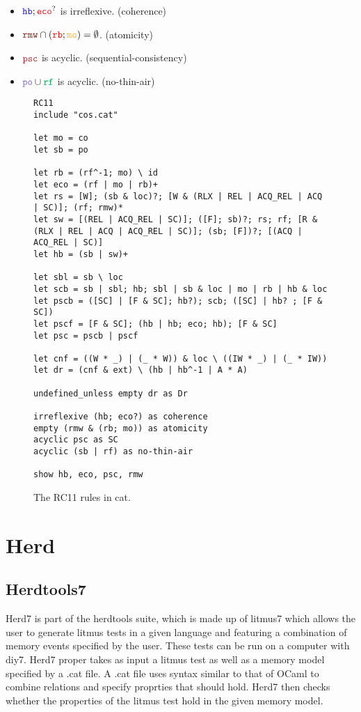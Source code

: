 \documentclass[a4,11pt,dvipsnames]{article}
\begin{document}
\begin{itemize}
\item $\texttt{\color{blue}hb} ; \texttt{\color{red}eco} ^?$ is irreflexive. \hfill (coherence)
\item $\rmw \cap (\rb ; \mo) = \emptyset$. \hfill (atomicity)
\item $\psc$ is acyclic. \hfill (sequential-consistency)
\item $\po \cup \rf$ is acyclic. \hfill (no-thin-air)
\end{itemize}


\begin{figure}
\centering
\begin{lstlisting}
RC11
include "cos.cat"

let mo = co
let sb = po

let rb = (rf^-1; mo) \ id
let eco = (rf | mo | rb)+
let rs = [W]; (sb & loc)?; [W & (RLX | REL | ACQ_REL | ACQ | SC)]; (rf; rmw)*
let sw = [(REL | ACQ_REL | SC)]; ([F]; sb)?; rs; rf; [R & (RLX | REL | ACQ | ACQ_REL | SC)]; (sb; [F])?; [(ACQ | ACQ_REL | SC)]
let hb = (sb | sw)+

let sbl = sb \ loc
let scb = sb | sbl; hb; sbl | sb & loc | mo | rb | hb & loc
let pscb = ([SC] | [F & SC]; hb?); scb; ([SC] | hb? ; [F & SC])
let pscf = [F & SC]; (hb | hb; eco; hb); [F & SC]
let psc = pscb | pscf

let cnf = ((W * _) | (_ * W)) & loc \ ((IW * _) | (_ * IW))
let dr = (cnf & ext) \ (hb | hb^-1 | A * A)

undefined_unless empty dr as Dr

irreflexive (hb; eco?) as coherence
empty (rmw & (rb; mo)) as atomicity
acyclic psc as SC
acyclic (sb | rf) as no-thin-air

show hb, eco, psc, rmw
\end{lstlisting}
\caption{The RC11 rules in cat.}
\label{fig:rc11-cat-code}
\end{figure}
\vfill
\section{Herd}

\subsection{Herdtools7}

Herd7 is part of the herdtools suite, which is made up of litmus7 which allows the user to generate litmus tests in a given language and featuring a combination of memory events specified by the user. These tests can be run on a computer with diy7. Herd7 proper takes as input a litmus test as well as a memory model specified by a .cat file. A .cat file uses syntax similar to that of OCaml to combine relations and specify proprties that should hold. Herd7 then checks whether the properties of the litmus test hold in the given memory model.
\end{document}
